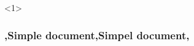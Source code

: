 \begin{frame}<1>
    \frametitle{\lang,Simple document,Simpel document,}

    \begin{columns}
        \begin{column}{0.5\textwidth}

            \usebox\preamblebox

            \usebox\documentbox

        \end{column}
        \begin{column}{0.5\textwidth}
        \end{column}
    \end{columns}
\end{frame}
